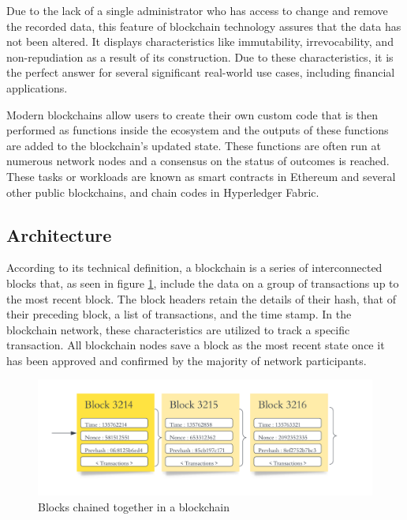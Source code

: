 \vspace{.5cm}

Due to the lack of a single administrator who has access to change and remove the recorded data, this feature of blockchain technology assures that the data has not been altered. It displays characteristics like immutability, irrevocability, and non-repudiation as a result of its construction. Due to these characteristics, it is the perfect answer for several significant real-world use cases, including financial applications.

\vspace{.5cm}

Modern blockchains allow users to create their own custom code that is then performed as functions inside the ecosystem and the outputs of these functions are added to the blockchain's updated state. These functions are often run at numerous network nodes and a consensus on the status of outcomes is reached. These tasks or workloads are known as smart contracts in Ethereum and several other public blockchains, and chain codes in Hyperledger Fabric.


\subsection{Architecture}
According to its technical definition, a blockchain is a series of interconnected blocks that, as seen in figure \ref{Blocks chained together in a blockchain}, include the data on a group of transactions up to the most recent block. The block headers retain the details of their hash, that of their preceding block, a list of transactions, and the time stamp. In the blockchain network, these characteristics are utilized to track a specific transaction. All blockchain nodes save a block as the most recent state once it has been approved and confirmed by the majority of network participants.

 \vspace{.5cm}
 
\begin{figure}[h]
  \includegraphics[width=\textwidth]{includes/figures/blocks.png}
  \caption{Blocks chained together in a blockchain \cite{bcdig}}
  \label{Blocks chained together in a blockchain}
\end{figure}

